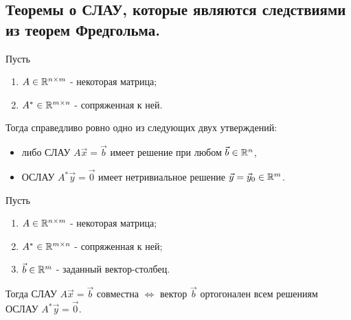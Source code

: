 \subsection{
    Теоремы о СЛАУ, которые являются следствиями из теорем Фредгольма.
}

\begin{theorem} Пусть 
    \begin{enumerate}
        \item $A \in \mathbb{R}^{n \times m}$ - некоторая матрица;
        \item $A^* \in \mathbb{R}^{m \times n}$ - сопряженная к ней.
    \end{enumerate}

    Тогда справедливо ровно одно из следующих двух утверждений:

    \begin{itemize}
        \item либо СЛАУ $A\vec{x} = \vec{b}$ имеет решение при любом $\vec{b} \in \mathbb{R}^n$, 
        \item ОСЛАУ $A^*\vec{y} = \vec{0}$ имеет нетривиальное решение $\vec{y} = \vec{y}_0 \in \mathbb{R}^m$.
    \end{itemize}
\end{theorem}

\begin{theorem} Пусть
    \begin{enumerate}
        \item $A \in \mathbb{R}^{n \times m}$ - некоторая матрица;
        \item $A^* \in \mathbb{R}^{m \times n}$ - сопряженная к ней;
        \item $\vec{b} \in \mathbb{R}^{m}$ - заданный вектор-столбец.
    \end{enumerate}

    Тогда СЛАУ $A\vec{x} = \vec{b}$ совместна $\iff$ вектор $\vec{b}$ ортогонален всем решениям ОСЛАУ $A^*\vec{y} = \vec{0}$.
\end{theorem}
